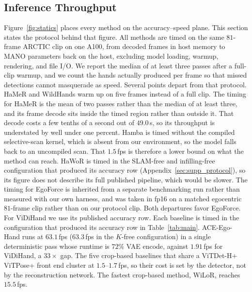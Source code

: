 \documentclass[10pt,twocolumn,letterpaper]{article}
\newcommand{\method}{ACE-Ego-Hand} %
\begin{document}
\subsection{Inference Throughput}
\label{sec:supp_speed}
Figure~\ref{fig:statics} places every method on the accuracy--speed plane. This section states the protocol behind that figure. All methods are timed on the same $81$-frame ARCTIC clip on one A100, from decoded frames in host memory to MANO parameters back on the host, excluding model loading, warmup, rendering, and file I/O. We report the median of at least three passes after a full-clip warmup, and we count the hands actually produced per frame so that missed detections cannot masquerade as speed. Several points depart from that protocol. HaMeR and WildHands warm up on five frames instead of a full clip. The timing for HaMeR is the mean of two passes rather than the median of at least three, and its frame decode sits inside the timed region rather than outside it. That decode costs a few tenths of a second out of $49.0$\,s, so its throughput is understated by well under one percent. Hamba is timed without the compiled selective-scan kernel, which is absent from our environment, so the model falls back to an uncompiled scan. That $1.5$\,fps is therefore a lower bound on what the method can reach. HaWoR is timed in the SLAM-free and infilling-free configuration that produced its accuracy row (Appendix~\ref{sec:supp_protocol}), so its figure does not describe its full published pipeline, which would be slower. The timing for EgoForce is inherited from a separate benchmarking run rather than measured with our own harness, and was taken in fp16 on a matched egocentric $81$-frame clip rather than on our protocol clip. Both departures favor EgoForce. For ViDiHand we use its published accuracy row. Each baseline is timed in the configuration that produced its accuracy row in Table~\ref{tab:main}. \method{} runs at $63.1$\,fps ($63.3$\,fps in the $K$-free configuration) in a single deterministic pass whose runtime is $72\%$ VAE encode, against $1.91$\,fps for ViDiHand, a $33\times$ gap. The five crop-based baselines that share a ViTDet-H$+$ViTPose$+$ front end cluster at $1.5$--$1.7$\,fps, so their cost is set by the detector, not by the reconstruction network. The fastest crop-based method, WiLoR, reaches $15.5$\,fps.
\end{document}
